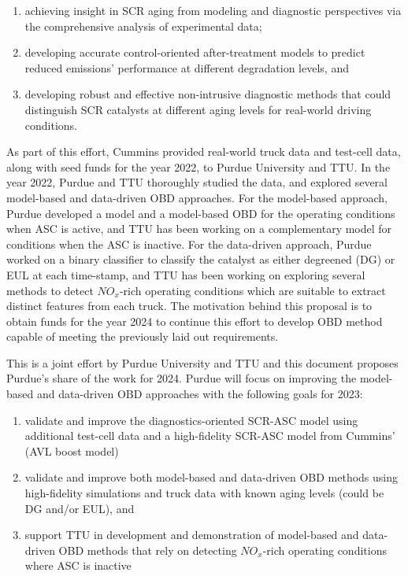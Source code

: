 \begin{enumerate}
\item achieving insight in SCR aging from modeling and diagnostic perspectives
via the comprehensive analysis of experimental data;
\item developing accurate control-oriented after-treatment models to predict
reduced emissions' performance at different degradation levels, and
\item developing robust and effective non-intrusive diagnostic methods that could distinguish SCR catalysts at different aging levels for real-world driving conditions.
\end{enumerate}

As part of this effort, Cummins provided real-world truck data and test-cell
data, along with seed funds for the year 2022, to Purdue University and TTU. In
the year 2022, Purdue and TTU thoroughly studied the data, and explored several
model-based and data-driven OBD approaches. For the model-based approach,
Purdue developed a model and a model-based OBD for the operating conditions
when ASC is active, and TTU has been working on a complementary model for
conditions when the ASC is inactive. For the data-driven approach, Purdue
worked on a binary classifier to classify the catalyst as either degreened (DG)
or EUL at each time-stamp, and TTU has been working on exploring several
methods to detect $NO_x$-rich operating conditions which are suitable to
extract distinct features from each truck. The motivation behind this proposal
is to obtain funds for the year 2024 to continue this effort to develop OBD
method capable of meeting the previously laid out requirements.

This is a joint effort by Purdue University and TTU and this document proposes
Purdue's share of the work for 2024. Purdue will focus on improving the
model-based and data-driven OBD approaches with the following goals for 2023:
\begin{enumerate}
\item validate and improve the diagnostics-oriented SCR-ASC model using
additional test-cell data and a high-fidelity SCR-ASC model from Cummins' (AVL
boost model)
\item validate and improve both model-based and data-driven OBD methods using
high-fidelity simulations and truck data with known aging levels (could be DG
and/or EUL), and
\item  support TTU in development and demonstration of model-based and data-driven OBD methods that rely on detecting $NO_x$-rich operating conditions where ASC is inactive
\end{enumerate}

